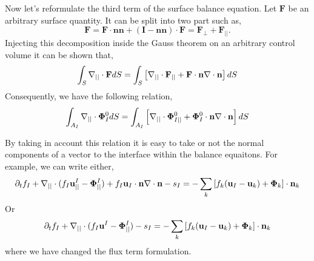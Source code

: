 Now let's reformulate the third term of the surface balance equation. 
Let $\textbf{F}$ be an arbitrary surface quantity. 
It can be split into two part such as, 
\begin{equation*}
    \textbf{F} 
    = \textbf{F} \cdot \textbf{n}\textbf{n}
    + (\textbf{I} - \textbf{nn})  \cdot \textbf{F}
    = \textbf{F}_\bot + \textbf{F}_{||}.
\end{equation*}
Injecting this decomposition inside the Gauss theorem on an arbitrary control volume it can be shown that, 
\begin{equation*}
    \int_{S} \mathbf{\nabla}_{||}\cdot \textbf{F}dS
    = 
    \int_{S} \left[\mathbf{\nabla}_{||}\cdot \textbf{F}_{||} 
    + \textbf{F} \cdot \textbf{n} \mathbf{\nabla}\cdot\textbf{n}
    \right]dS
\end{equation*}
Consequently, we have the following relation,
\begin{equation*}
    \int_{A_I} \mathbf{\nabla}_{||}\cdot \bm\Phi_I^0dS
    = 
    \int_{A_I} \left[\mathbf{\nabla}_{||}\cdot \bm\Phi_{I||}^0
    + \bm\Phi_I^0 \cdot \textbf{n} \mathbf{\nabla}\cdot\textbf{n}
    \right]dS
\end{equation*}

By taking in account this relation it is easy to take or not the normal components of a vector to the interface within the balance equaitons. 
For example, we can write either, 
\begin{equation}
    \partial_t f_I  
    + \mathbf{\nabla}_{||}\cdot (f_I \textbf{u}^I_{||} -\mathbf{\Phi}^I_{||})
    + f_I \textbf{u}_I \cdot \textbf{n} \mathbf{\nabla}\cdot \textbf{n}
    - s_I
    = 
    - \sum_k \left[
    f_k (\textbf{u}_I - \textbf{u}_k)
    + \mathbf{\Phi}_k
    \right] \cdot \textbf{n}_k 
    \label{ap:eq:dt_f_I2}
\end{equation}
Or 
\begin{equation}
    \partial_t f_I  
    + \mathbf{\nabla}_{||}\cdot (f_I \textbf{u}^I -\mathbf{\Phi}^I_{||})
    - s_I
    = 
    - \sum_k \left[
    f_k (\textbf{u}_I - \textbf{u}_k)
    + \mathbf{\Phi}_k
    \right] \cdot \textbf{n}_k 
    \label{ap:eq:dt_f_I2}
\end{equation}
where we have changed the flux term formulation. 



